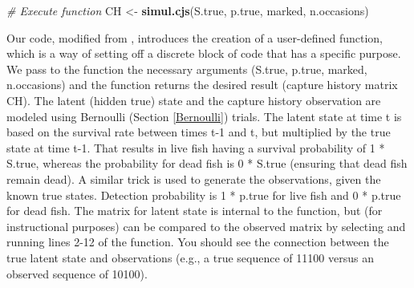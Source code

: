 \documentclass[
]{krantz}
\makeatletter
\newenvironment{Shaded}{\begin{snugshade}}{\end{snugshade}}
\newcommand{\CommentTok}[1]{\textcolor[rgb]{0.37,0.37,0.37}{\textit{#1}}}
\newcommand{\FunctionTok}[1]{\textcolor[rgb]{0.27,0.27,0.27}{\textbf{#1}}}
\newcommand{\NormalTok}[1]{#1}
\newcommand{\OtherTok}[1]{\textcolor[rgb]{0.37,0.37,0.37}{#1}}
\newenvironment{kframe}{%
\medskip{}
\setlength{\fboxsep}{.8em}
 \def\at@end@of@kframe{}%
 \ifinner\ifhmode%
  \def\at@end@of@kframe{\end{minipage}}%
  \begin{minipage}{\columnwidth}%
 \fi\fi%
 \def\FrameCommand##1{\hskip\@totalleftmargin \hskip-\fboxsep
 \colorbox{shadecolor}{##1}\hskip-\fboxsep
     \hskip-\linewidth \hskip-\@totalleftmargin \hskip\columnwidth}%
 \MakeFramed {\advance\hsize-\width
   \@totalleftmargin\z@ \linewidth\hsize
   \@setminipage}}%
 {\par\unskip\endMakeFramed%
 \at@end@of@kframe}
\renewenvironment{Shaded}{\begin{kframe}}{\end{kframe}}
\makeatother
\begin{document}
\begin{Shaded}
\begin{Highlighting}[]
\CommentTok{\# Execute function}
\NormalTok{CH }\OtherTok{\textless{}{-}} \FunctionTok{simul.cjs}\NormalTok{(S.true, p.true, marked, n.occasions)}
\end{Highlighting}
\end{Shaded}

Our code, modified from \citet{kéry.schaub_2012}, introduces the creation of a user-defined function, which is a way of setting off a discrete block of code that has a specific purpose. We pass to the function the necessary arguments (S.true, p.true, marked, n.occasions) and the function returns the desired result (capture history matrix CH). The latent (hidden true) state and the capture history observation are modeled using Bernoulli (Section \ref{Bernoulli}) trials. The latent state at time t is based on the survival rate between times t-1 and t, but multiplied by the true state at time t-1. That results in live fish having a survival probability of 1 * S.true, whereas the probability for dead fish is 0 * S.true (ensuring that dead fish remain dead). A similar trick is used to generate the observations, given the known true states. Detection probability is 1 * p.true for live fish and 0 * p.true for dead fish. The matrix for latent state is internal to the function, but (for instructional purposes) can be compared to the observed matrix by selecting and running lines 2-12 of the function. You should see the connection between the true latent state and observations (e.g., a true sequence of 11100 versus an observed sequence of 10100).
\end{document}

